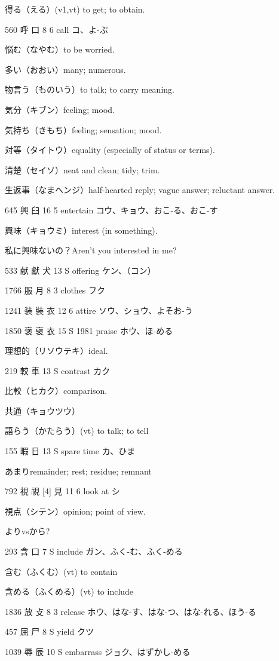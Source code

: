 得る（える）(v1,vt) to get; to obtain.

560	呼		口	8	6		call	コ、よ-ぶ

悩む（なやむ）to be worried.

多い（おおい）many; numerous.

物言う（ものいう）to talk; to carry meaning.

気分（キブン）feeling; mood.

気持ち（きもち）feeling; sensation; mood.

対等（タイトウ）equality (especially of status or terms).

清楚（セイソ）neat and clean; tidy; trim.

生返事（なまヘンジ）half-hearted reply; vague answer; reluctant answer.

645	興		臼	16	5		entertain	コウ、キョウ、おこ-る、おこ-す

興味（キョウミ）interest (in something).

私に興味ないの？Aren't you interested in me?

533	献	獻	犬	13	S		offering	ケン、（コン）

1766	服		月	8	3		clothes	フク

1241	装	裝	衣	12	6		attire	ソウ、ショウ、よそお-う

1850	褒	襃	衣	15	S	1981	praise	ホウ、ほ-める

理想的（リソウテキ）ideal.

219	較		車	13	S		contrast	カク

比較（ヒカク）comparison.

共通（キョウツウ）

語らう（かたらう）(vt) to talk; to tell

155	暇		日	13	S		spare time	カ、ひま

あまりremainder; rest; residue; remnant

792	視	視 [4]	見	11	6		look at	シ

視点（シテン）opinion; point of view.

よりvsから?

293	含		口	7	S		include	ガン、ふく-む、ふく-める

含む（ふくむ）(vt) to contain

含める（ふくめる）(vt) to include

1836	放		攴	8	3		release	ホウ、はな-す、はな-つ、はな-れる、ほう-る

457	屈		尸	8	S		yield	クツ

1039	辱		辰	10	S		embarrass	ジョク、はずかし-める

